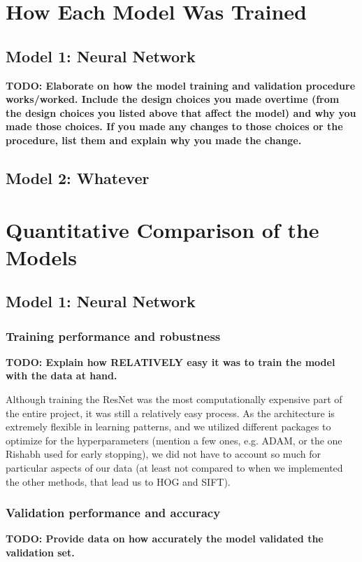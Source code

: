 \documentclass[10pt]{article} %
\begin{document}
\section{How Each Model Was Trained}
\subsection{Model 1: Neural Network}
\textbf{TODO: Elaborate on how the model training and validation procedure works/worked. Include the design choices you made overtime (from the design choices you listed above that affect the model) and why you made those choices. If you made any changes to those choices or the procedure, list them and explain why you made the change.}
\subsection{Model 2: Whatever}

\section{Quantitative Comparison of the Models}
\subsection{Model 1: Neural Network}
\subsubsection{Training performance and robustness}
\textbf{TODO: Explain how RELATIVELY easy it was to train the model with the data at hand.}

Although training the ResNet was the most computationally expensive part of the entire project, it was still a relatively easy process. As the architecture is extremely flexible in learning patterns, and we utilized different packages to optimize for the hyperparameters (mention a few ones, e.g. ADAM, or the one Rishabh used for early stopping), we did not have to account so much for particular aspects of our data (at least not compared to when we implemented the other methods, that lead us to HOG and SIFT).


\subsubsection{Validation performance and accuracy}


\textbf{TODO: Provide data on how accurately the model validated the validation set.}
\end{document}
